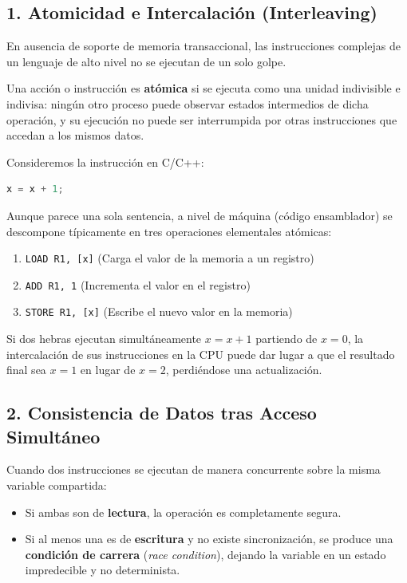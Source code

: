 \subsection{1. Atomicidad e Intercalación (Interleaving)}
En ausencia de soporte de memoria transaccional, las instrucciones complejas de un lenguaje de alto nivel no se ejecutan de un solo golpe.

\begin{definicion}
Una acción o instrucción es \textbf{atómica} si se ejecuta como una unidad indivisible e indivisa: ningún otro proceso puede observar estados intermedios de dicha operación, y su ejecución no puede ser interrumpida por otras instrucciones que accedan a los mismos datos.
\end{definicion}

\begin{ejemplo}
Consideremos la instrucción en C/C++:
\begin{lstlisting}[language=C++]
x = x + 1;
\end{lstlisting}
Aunque parece una sola sentencia, a nivel de máquina (código ensamblador) se descompone típicamente en tres operaciones elementales atómicas:
\begin{enumerate}
    \item \texttt{LOAD  R1, [x]}  \quad (Carga el valor de la memoria a un registro)
    \item \texttt{ADD   R1, 1}     \quad (Incrementa el valor en el registro)
    \item \texttt{STORE R1, [x]}  \quad (Escribe el nuevo valor en la memoria)
\end{enumerate}
Si dos hebras ejecutan simultáneamente $x = x + 1$ partiendo de $x = 0$, la intercalación de sus instrucciones en la CPU puede dar lugar a que el resultado final sea $x = 1$ en lugar de $x = 2$, perdiéndose una actualización.
\end{ejemplo}

\subsection{2. Consistencia de Datos tras Acceso Simultáneo}
Cuando dos instrucciones se ejecutan de manera concurrente sobre la misma variable compartida:
\begin{itemize}
    \item Si ambas son de \textbf{lectura}, la operación es completamente segura.
    \item Si al menos una es de \textbf{escritura} y no existe sincronización, se produce una \textbf{condición de carrera} (\textit{race condition}), dejando la variable en un estado impredecible y no determinista.
\end{itemize}

